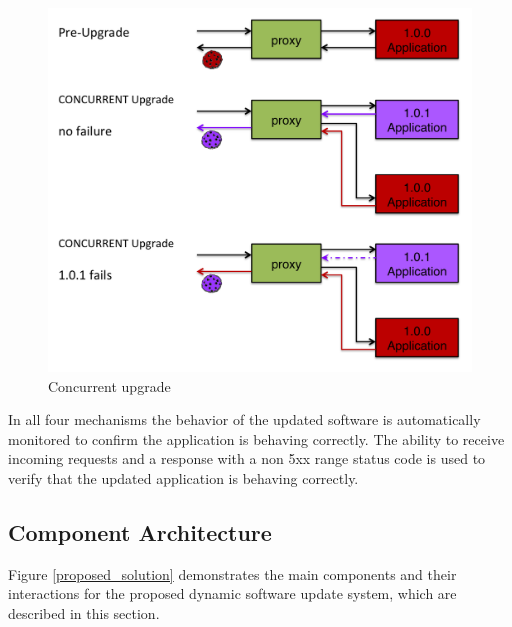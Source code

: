 \documentclass[a4paper,11pt,twoside]{report}
\begin{document}
\begin{figure}[!ht]
  \centering
     \includegraphics[scale=0.30]{concurrent_upgrade}
  \caption{Concurrent upgrade}
  \label{concurrent_upgrade}
\end{figure}

In all four mechanisms the behavior of the updated software is automatically monitored to confirm the application is behaving correctly. The ability to receive incoming requests and a response with a non 5xx range status code is used to verify that the updated application is behaving correctly. 


\subsection{Component Architecture}
Figure \ref{proposed_solution} demonstrates the main components and their interactions for the proposed dynamic software update system, which are described in this section.
\end{document}
